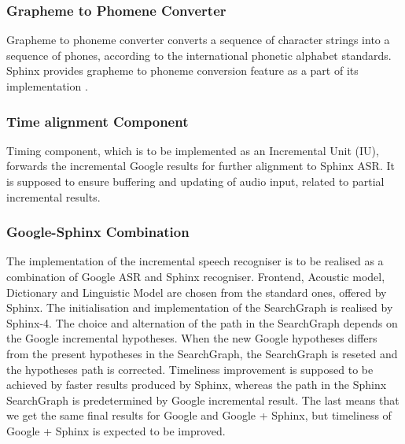 \subsubsection {Grapheme to Phomene Converter}
Grapheme to phoneme converter converts  a sequence of character strings into a
sequence of phones, according to the international phonetic alphabet  standards.  
Sphinx provides grapheme to phoneme conversion feature as a part of its
implementation \parencite {Lamereetal2013:Eurospeech}.
\subsubsection {Time alignment Component}
Timing component, which is to be implemented as an
Incremental Unit (IU), forwards the incremental Google results for further
alignment to Sphinx ASR. It is supposed to ensure buffering and updating of
audio input, related to partial incremental results.
\subsubsection {Google-Sphinx Combination}
The implementation of the incremental speech recogniser is to be realised as a
combination of Google ASR and Sphinx recogniser. 
Frontend, Acoustic model, Dictionary and Linguistic Model are chosen from
the standard ones, offered by Sphinx. 
The initialisation and implementation of the SearchGraph is realised by
Sphinx-4. The choice and alternation of the path in
the SearchGraph depends on the Google incremental hypotheses. 
When the new Google hypotheses differs from the present hypotheses in the
SearchGraph, the SearchGraph is reseted and the hypotheses path is
corrected.  Timeliness improvement is supposed to be achieved by faster results
produced by Sphinx, whereas the path in the Sphinx SearchGraph is predetermined
by Google incremental result. The last means that we get the same final results
for Google and Google + Sphinx, but timeliness of Google + Sphinx
is expected to be improved. 
